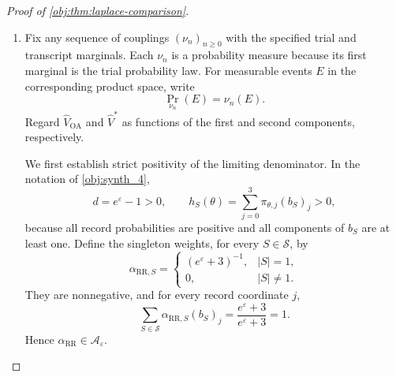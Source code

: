 \begin{proof}[Proof of \cref{obj:thm:laplace-comparison}]
\begin{enumerate}
Take the privacy sequence
\[
\varepsilon_n=\varepsilon,\qquad n\in\mathbb N.
\]
It satisfies \cref{obj:ass:fixed-privacy}. The fixed measurable strong-saddle selector, the interior parameters, the chosen schedule, and \(0<\gamma<1\) meet the hypotheses of \cref{obj:thm:pilot-attainment}. Its variance-consistency conclusion supplies, under the transcript law of the selected procedure,
\[
\Pr_\theta\!\left(
|\widehat V^*-V^*(\theta,p,\varepsilon)|>\delta
\right)\longrightarrow0
\qquad(\delta>0).
\]

\item Fix any sequence of couplings \((\nu_n)_{n\ge0}\) with the specified trial and transcript marginals. Each \(\nu_n\) is a probability measure because its first marginal is the trial probability law. For measurable events \(E\) in the corresponding product space, write
\[
\Pr_{\nu_n}(E)=\nu_n(E).
\]
Regard \(\widehat V_{\mathrm{OA}}\) and \(\widehat V^*\) as functions of the first and second components, respectively.

We first establish strict positivity of the limiting denominator. In the notation of \cref{obj:synth_4},
\[
d=e^\varepsilon-1>0,
\qquad
h_S(\theta)
=
\sum_{j=0}^3\pi_{\theta,j}(b_S)_j>0,
\]
because all record probabilities are positive and all components of \(b_S\) are at least one. Define the singleton weights, for every \(S\in\mathcal S\), by
\[
\alpha_{\mathrm{RR},S}
=
\begin{cases}
(e^\varepsilon+3)^{-1},&|S|=1,\\
0,&|S|\ne1.
\end{cases}
\]
They are nonnegative, and for every record coordinate \(j\),
\[
\sum_{S\in\mathcal S}
\alpha_{\mathrm{RR},S}(b_S)_j
=
\frac{e^\varepsilon+3}{e^\varepsilon+3}=1.
\]
Hence \(\alpha_{\mathrm{RR}}\in\mathcal A_\varepsilon\).


\end{enumerate}
\end{proof}
